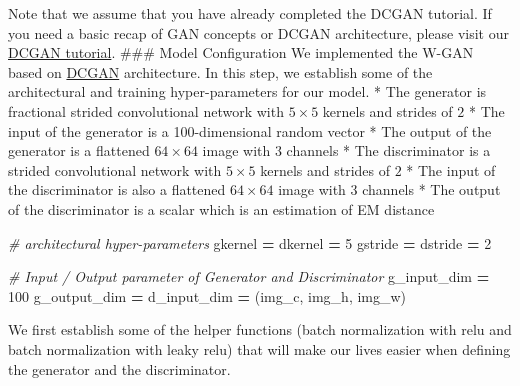 \documentclass[]{book}
\newenvironment{Shaded}{\begin{snugshade}}{\end{snugshade}}
\newcommand{\DecValTok}[1]{\textcolor[rgb]{0.00,0.00,0.81}{#1}}
\newcommand{\CommentTok}[1]{\textcolor[rgb]{0.56,0.35,0.01}{\textit{#1}}}
\newcommand{\OperatorTok}[1]{\textcolor[rgb]{0.81,0.36,0.00}{\textbf{#1}}}
\newcommand{\NormalTok}[1]{#1}
\theoremstyle{definition}
\theoremstyle{definition}
\theoremstyle{definition}
\theoremstyle{remark}
\begin{document}
Note that we assume that you have already completed the DCGAN tutorial.
If you need a basic recap of GAN concepts or DCGAN architecture, please
visit our
\href{https://github.com/Microsoft/CNTK/blob/master/Tutorials/CNTK_206B_DCGAN.ipynb}{DCGAN
tutorial}. \#\#\# Model Configuration We implemented the W-GAN based on
\href{https://arxiv.org/pdf/1511.06434.pdf}{DCGAN} architecture. In this
step, we establish some of the architectural and training
hyper-parameters for our model. * The generator is fractional strided
convolutional network with \(5\times5\) kernels and strides of \(2\) *
The input of the generator is a 100-dimensional random vector * The
output of the generator is a flattened \(64\times64\) image with \(3\)
channels * The discriminator is a strided convolutional network with
\(5\times5\) kernels and strides of \(2\) * The input of the
discriminator is also a flattened \(64\times64\) image with \(3\)
channels * The output of the discriminator is a scalar which is an
estimation of EM distance

\begin{Shaded}
\begin{Highlighting}[]
\CommentTok{# architectural hyper-parameters}
\NormalTok{gkernel }\OperatorTok{=}\NormalTok{ dkernel }\OperatorTok{=} \DecValTok{5}
\NormalTok{gstride }\OperatorTok{=}\NormalTok{ dstride }\OperatorTok{=} \DecValTok{2}

\CommentTok{# Input / Output parameter of Generator and Discriminator}
\NormalTok{g_input_dim }\OperatorTok{=} \DecValTok{100}
\NormalTok{g_output_dim }\OperatorTok{=}\NormalTok{ d_input_dim }\OperatorTok{=}\NormalTok{ (img_c, img_h, img_w)}
\end{Highlighting}
\end{Shaded}

We first establish some of the helper functions (batch normalization
with relu and batch normalization with leaky relu) that will make our
lives easier when defining the generator and the discriminator.
\end{document}

